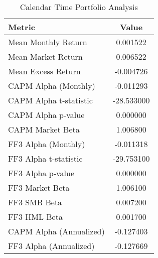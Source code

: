 \begin{table}
\caption{Calendar Time Portfolio Analysis}
\label{tab:calendar_time}
\begin{tabular}{lc}
\toprule
Metric & Value \\
\midrule
Mean Monthly Return & 0.001522 \\
Mean Market Return & 0.006522 \\
Mean Excess Return & -0.004726 \\
CAPM Alpha (Monthly) & -0.011293 \\
CAPM Alpha t-statistic & -28.533000 \\
CAPM Alpha p-value & 0.000000 \\
CAPM Market Beta & 1.006800 \\
FF3 Alpha (Monthly) & -0.011318 \\
FF3 Alpha t-statistic & -29.753100 \\
FF3 Alpha p-value & 0.000000 \\
FF3 Market Beta & 1.006100 \\
FF3 SMB Beta & 0.007200 \\
FF3 HML Beta & 0.001700 \\
CAPM Alpha (Annualized) & -0.127403 \\
FF3 Alpha (Annualized) & -0.127669 \\
\bottomrule
\end{tabular}
\end{table}

